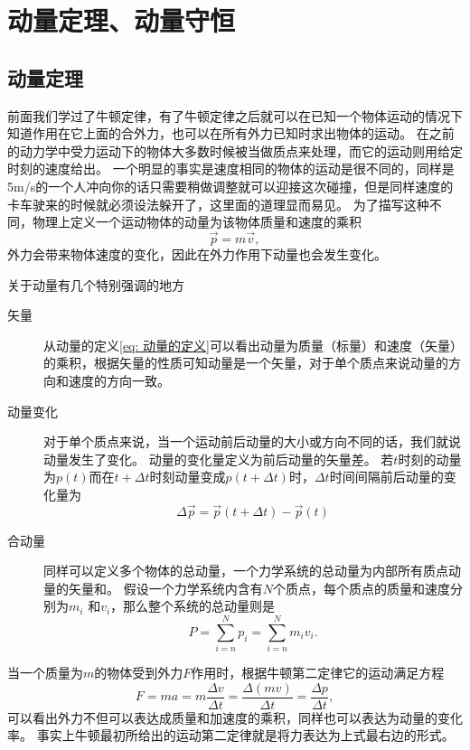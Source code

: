 


\chapter{动量定理、动量守恒}
\section{动量定理}
前面我们学过了牛顿定律，有了牛顿定律之后就可以在已知一个物体运动的情况下知道作用在它上面的合外力，也可以在所有外力已知时求出物体的运动。
在之前的动力学中受力运动下的物体大多数时候被当做质点来处理，而它的运动则用给定时刻的速度给出。
一个明显的事实是速度相同的物体的运动是很不同的，同样是5\unit{m/s}的一个人冲向你的话只需要稍做调整就可以迎接这次碰撞，但是同样速度的卡车驶来的时候就必须设法躲开了，这里面的道理显而易见。
为了描写这种不同，物理上定义一个运动物体的动量为该物体质量和速度的乘积
\begin{equation}\label{eq: 动量的定义}
\vec{p} = m\vec{v},
\end{equation}
外力会带来物体速度的变化，因此在外力作用下动量也会发生变化。

关于动量有几个特别强调的地方
\begin{description}
\item[矢量] 从动量的定义\ref{eq: 动量的定义}可以看出动量为质量（标量）和速度（矢量）的乘积，根据矢量的性质可知动量是一个矢量，对于单个质点来说动量的方向和速度的方向一致。

\item[动量变化] 对于单个质点来说，当一个运动前后动量的大小或方向不同的话，我们就说动量发生了变化。
动量的变化量定义为前后动量的矢量差。
若$t$时刻的动量为$p(t)$而在$t+\Delta t$时刻动量变成$p(t+\Delta t)$时，$\Delta t$时间间隔前后动量的变化量为
\begin{equation}
\Delta \vec{p} = \vec{p}(t+\Delta t)-\vec{p}(t)
\end{equation}
\item[合动量]同样可以定义多个物体的总动量，一个力学系统的总动量为内部所有质点动量的矢量和。
假设一个力学系统内含有$N$个质点，每个质点的质量和速度分别为$m_i$ 和$v_i$，那么整个系统的总动量则是
\begin{equation}
P = \sum_{i=n}^{N}p_i = \sum_{i=n}^{N}m_iv_i .
\end{equation}
\end{description}

当一个质量为$m$的物体受到外力$F$作用时，根据牛顿第二定律它的运动满足方程
\begin{equation}
F = ma = m\frac{\Delta v}{\Delta t} = \frac{\Delta (mv)}{\Delta t} =  \frac{\Delta p}{\Delta t} ,
\end{equation}
可以看出外力不但可以表达成质量和加速度的乘积，同样也可以表达为动量的变化率。
事实上牛顿最初所给出的运动第二定律就是将力表达为上式最右边的形式。

